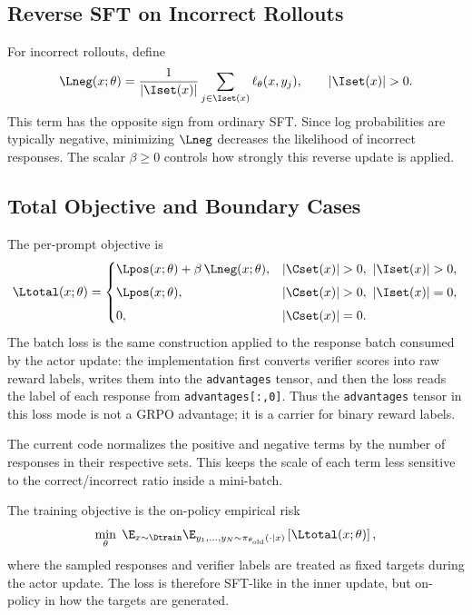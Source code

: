 \subsection{Reverse SFT on Incorrect Rollouts}

For incorrect rollouts, define
\begin{equation}
    \Lneg(x;\theta)
    =
    \frac{1}{|\Iset(x)|}
    \sum_{j\in\Iset(x)}
    \ell_{\theta}(x,y_j),
    \qquad |\Iset(x)|>0.
    \label{eq:opsft-lneg}
\end{equation}
This term has the opposite sign from ordinary SFT. Since log probabilities are
typically negative, minimizing $\Lneg$ decreases the likelihood of incorrect
responses. The scalar $\beta\ge 0$ controls how strongly this reverse update is
applied.

\subsection{Total Objective and Boundary Cases}

The per-prompt objective is
\begin{equation}
    \Ltotal(x;\theta)
    =
    \begin{cases}
    \Lpos(x;\theta)+\beta\,\Lneg(x;\theta),
        & |\Cset(x)|>0,\ |\Iset(x)|>0,\\[0.4em]
    \Lpos(x;\theta),
        & |\Cset(x)|>0,\ |\Iset(x)|=0,\\[0.4em]
    0,
        & |\Cset(x)|=0.
    \end{cases}
    \label{eq:opsft-total-loss}
\end{equation}
The batch loss is the same construction applied to the response batch consumed
by the actor update: the implementation first converts verifier scores into raw
reward labels, writes them into the \texttt{advantages} tensor, and then the
loss reads the label of each response from \texttt{advantages[:,0]}. Thus the
\texttt{advantages} tensor in this loss mode is not a GRPO advantage; it is a
carrier for binary reward labels.

The current code normalizes the positive and negative terms by the number of
responses in their respective sets. This keeps the scale of each term less
sensitive to the correct/incorrect ratio inside a mini-batch.

The training objective is the on-policy empirical risk
\begin{equation}
    \min_{\theta}\;
    \E_{x\sim\Dtrain}
    \E_{y_1,\ldots,y_N\sim \pi_{\theta_{\mathrm{old}}}(\cdot\mid x)}
    \left[
        \Ltotal(x;\theta)
    \right],
    \label{eq:opsft-population-objective}
\end{equation}
where the sampled responses and verifier labels are treated as fixed targets
during the actor update. The loss is therefore SFT-like in the inner update,
but on-policy in how the targets are generated.

